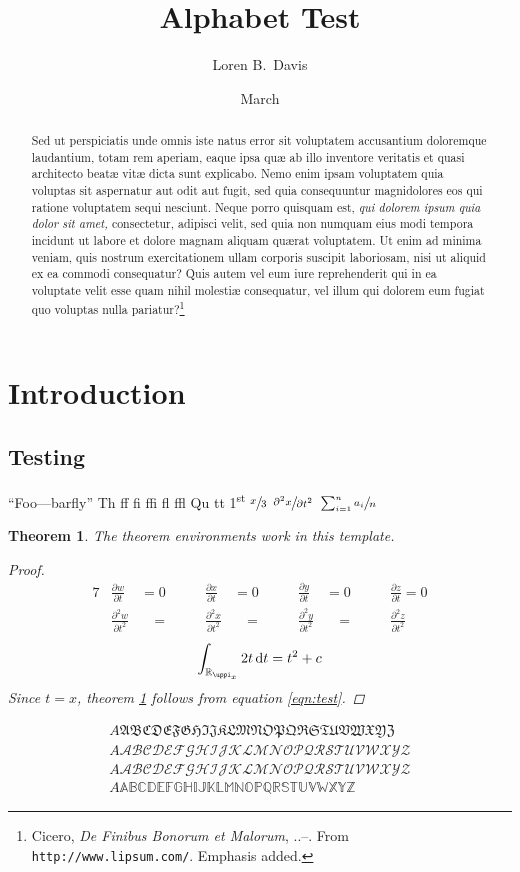 \documentclass[paper=letter,pagesize=automedia,twoside=false,12pt]{scrartcl}
\title{Alphabet Test}
\author{Loren B.\ Davis}
\date{\oldstylenums{11} March \oldstylenums{2012}}
\DeclareRobustCommand{\altcolor}{\color{NavyBlue}}
\DeclareRobustCommand\liningnums[1]{{\fontfamily{qpl}\selectfont {#1}}}
\DeclareRobustCommand{\liningnums}[1]{\addfontfeature{RawFeature=-onum, Numbers=Lining} {#1}}
\numberwithin{equation}{subsection}
\theoremstyle{plain}%
\newtheorem{Theorem}{\altcolor Theorem}
\theoremstyle{definition}
\theoremstyle{remark}
\DeclareRobustCommand{\dwrt}[1]{\ensuremath\mathop{\mathrm{d}{#1}}}
\begin{document}
\maketitle
\begin{abstract}
Sed ut perspiciatis unde omnis iste natus error sit voluptatem accusantium doloremque laudantium, totam rem aperiam, eaque ipsa quæ ab illo inventore veritatis et quasi architecto beatæ vitæ dicta sunt explicabo. Nemo enim ipsam voluptatem quia voluptas sit aspernatur aut odit aut fugit, sed quia consequuntur magnidolores eos qui ratione voluptatem sequi nesciunt. Neque porro quisquam est, \emph{qui dolorem ipsum quia dolor sit amet,} consectetur, adipisci velit, sed quia non numquam eius modi tempora incidunt ut labore et dolore magnam aliquam quærat voluptatem. Ut enim ad minima veniam, quis nostrum exercitationem ullam corporis suscipit laboriosam, nisi ut aliquid ex ea commodi consequatur? Quis autem vel eum iure reprehenderit qui in ea voluptate velit esse quam nihil molestiæ consequatur, vel illum qui dolorem eum fugiat quo voluptas nulla pariatur?\footnote{Cicero, \textit{De Finibus Bonorum et Malorum}, \textsection \liningnums{1}..--.  From \texttt{http://www.lipsum.com/}. Emphasis added.}
\end{abstract}

\section{Introduction}\label{sec:intro}
\subsection{Testing}
``Foo---barfly'' Th ff fi ffi fl ffl Qu tt 1\textsuperscript{st}  \(\sfrac{x}{3}\) \(\sfrac{\partial^2 x}{\partial t^2}\) \(\sfrac{\sum_{i=1}^n a_i}{n}\)

\begin{Theorem}\label{thm:test}
The theorem environments work in this template.

\begin{proof}
\begin{alignat*}{7}
&\frac{\partial w}{\partial t} &= 0 \qquad
&\frac{\partial x}{\partial t} &= 0 \qquad
&\frac{\partial y}{\partial t} &= 0 \qquad
&\frac{\partial z}{\partial t} = 0 \\
&\frac{\partial^2 w}{\partial t^2} &\quad = \quad
&\frac{\partial^2 x}{\partial t^2} &\quad = \quad
&\frac{\partial^2 y}{\partial t^2} &\quad = \quad
&\frac{\partial^2 z}{\partial t^2}
\end{alignat*}
\begin{equation}
\int_{\mathbb{R}_{\uppi_x}} 2t \dwrt{t} = t^2 + c \\ \label{eqn:test}
\end{equation}
Since \(t = x\), theorem \ref{thm:test} follows from equation \ref{eqn:test}.
\end{proof}
\end{Theorem}

\begin{align*}
A \mathfrak{ABCDEFGHIJKLMNOPQRSTUVWXYZ} \\
A \mathscr{ABCDEFGHIJKLMNOPQRSTUVWXYZ} \\
A \mathcal{ABCDEFGHIJKLMNOPQRSTUVWXYZ} \\
A \mathbb{ABCDEFGHIJKLMNOPQRSTUVWXYZ}
\end{align*}
\end{document}
